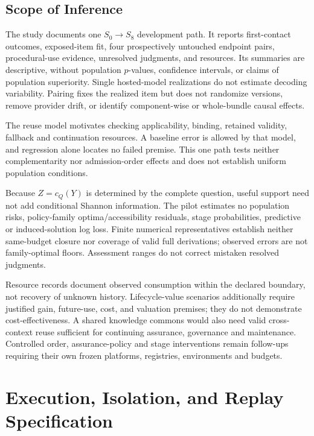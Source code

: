 \documentclass[10pt]{article} %
\providecommand{\1}{\mathbf{1}}  %
\theoremstyle{remark}
\theoremstyle{definition}
\begin{document}
\subsection{Scope of Inference}
\label{subsec:pilot-scope}

The study documents one $S_0\to S_8$ development path. It reports first-contact
outcomes, exposed-item fit, four prospectively untouched endpoint pairs,
procedural-use evidence, unresolved judgments, and resources. Its summaries
are descriptive, without population $p$-values, confidence intervals, or
claims of population superiority. Single hosted-model realizations do not
estimate decoding variability. Pairing fixes the realized item but does not
randomize versions, remove provider drift, or identify component-wise or
whole-bundle causal effects.

The reuse model motivates checking applicability, binding, retained validity,
fallback and continuation resources. A baseline error is allowed by that
model, and regression alone locates no failed premise. This one path tests
neither complementarity nor admission-order effects and does not establish
uniform population conditions.

Because $Z=c_Q(Y)$ is determined by the complete question, useful support
need not add conditional Shannon information. The pilot estimates no
population risks, policy-family optima/accessibility residuals, stage
probabilities, predictive or induced-solution log loss. Finite numerical
representatives establish neither same-budget closure nor coverage of valid
full derivations; observed errors are not family-optimal floors. Assessment
ranges do not correct mistaken resolved judgments.

Resource records document observed consumption within the declared
boundary, not recovery of unknown history. Lifecycle-value scenarios
additionally require justified gain, future-use, cost, and valuation
premises; they do not demonstrate cost-effectiveness. A shared knowledge
commons would also need valid cross-context reuse sufficient for continuing
assurance, governance and maintenance. Controlled order, assurance-policy
and stage interventions remain follow-ups requiring their own frozen
platforms, registries, environments and budgets.

\section{Execution, Isolation, and Replay Specification}
\label{app:execution-replay}
\end{document}
